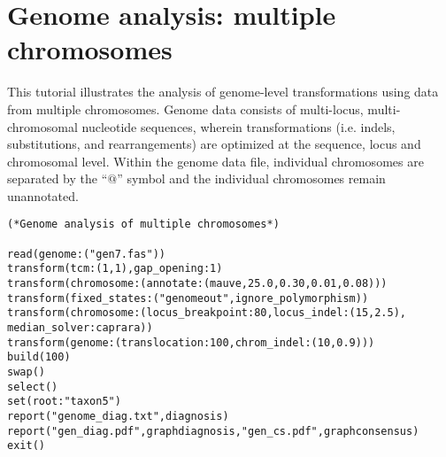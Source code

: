 
\section{Genome analysis: multiple chromosomes}{\label{tutorial11}}

This tutorial illustrates the analysis of genome-level transformations using data from multiple chromosomes. Genome 
data consists of multi-locus, multi-chromosomal nucleotide sequences, wherein transformations (i.e. indels, substitutions, and 
rearrangements) are optimized at the sequence, locus and chromosomal level.  Within the genome data file, individual 
chromosomes are separated by the ``$@$'' symbol and the individual chromosomes remain unannotated.

\begin{verbatim}
(*Genome analysis of multiple chromosomes*)

read(genome:("gen7.fas"))
transform(tcm:(1,1),gap_opening:1)
transform(chromosome:(annotate:(mauve,25.0,0.30,0.01,0.08)))
transform(fixed_states:("genomeout",ignore_polymorphism))
transform(chromosome:(locus_breakpoint:80,locus_indel:(15,2.5),
median_solver:caprara))
transform(genome:(translocation:100,chrom_indel:(10,0.9)))
build(100)
swap()
select()
set(root:"taxon5")
report("genome_diag.txt",diagnosis)
report("gen_diag.pdf",graphdiagnosis,"gen_cs.pdf",graphconsensus)
exit()
\end{verbatim}

